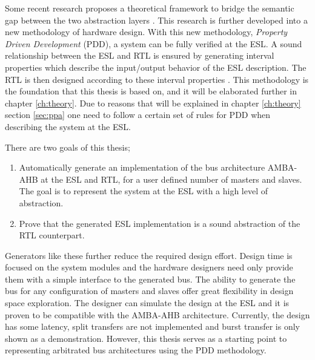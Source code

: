 Some recent research proposes a theoretical framework to bridge the semantic gap between the two abstraction layers \cite{2014-UrdahlStoffel.etal}. This research is further developed into a new methodology of hardware design. With this new methodology, \textit{Property Driven Development} (PDD), a system can be fully verified at the ESL. A sound relationship between the ESL and RTL is ensured by generating interval properties which describe the input/output behavior of the ESL description. The RTL is then designed according to these interval properties \cite{pddref}. This methodology is the foundation that this thesis is based on, and it will be elaborated further in chapter \ref{ch:theory}. Due to reasons that will be explained in chapter \ref{ch:theory} section \ref{sec:ppa} one need to follow a certain set of rules for PDD when describing the system at the ESL. \par 
There are two goals of this thesis; \\
\begin{enumerate}
 \item Automatically generate an implementation of the bus architecture AMBA-AHB at the ESL and RTL, for a user defined number of masters and slaves. The goal
is to represent the system at the ESL with a high level of abstraction.
 \item Prove that the generated ESL implementation is a sound abstraction of the RTL counterpart.
\end{enumerate}

Generators like these further reduce the required design effort. Design time is focused on the system modules and the hardware designers need only provide them with a simple interface to the generated bus. The ability to generate the bus for any configuration of masters and slaves offer great flexibility in design space exploration. The designer can simulate the design at the ESL and it is proven to be compatible with the AMBA-AHB architecture. Currently, the design has some latency, split transfers are not implemented and burst transfer is only shown as a demonstration. However, this thesis serves as a starting point to representing arbitrated bus architectures using the PDD methodology.   


 


